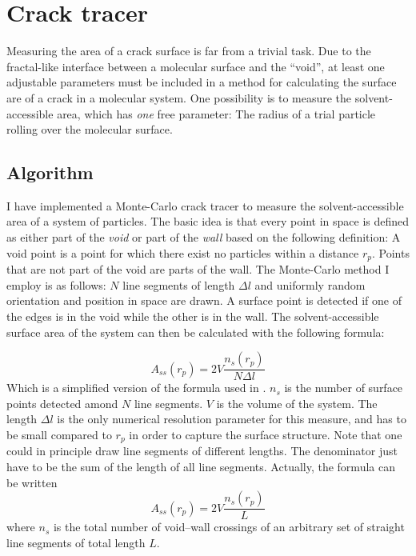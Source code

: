 \section{Crack tracer}
Measuring the area of a crack surface is far from a trivial task. Due to the fractal-like interface between a molecular surface and the ``void'', at least one adjustable parameters must be included in a method for calculating the surface are of a crack in a molecular system. One possibility is to measure the solvent-accessible area, which has \emph{one} free parameter: The radius of a trial particle rolling over the molecular surface. 


\subsection{Algorithm}
I have implemented a Monte-Carlo crack tracer to measure the solvent-accessible area of a system of particles. The basic idea is that every point in space is defined as either part of the \emph{void} or part of the \emph{wall} based on the following definition: A void point is a point for which there exist no particles within a distance $r_p$. Points that are not part of the void are parts of the wall. The Monte-Carlo method I employ is as follows: $N$ line segments of length $\Delta l$ and uniformly random orientation and position in space are drawn. A surface point is detected if one of the edges is in the void while the other is in the wall. The solvent-accessible surface area of the system can then be calculated with the following formula:

\begin{equation}
A_{ss}(r_p) = 2V\frac{n_s(r_p)}{N\Delta l}
\end{equation}
Which is a simplified version of the formula used in \citet{Bhattacharya2009}. $n_s$ is the number of surface points detected amond $N$ line segments. $V$ is the volume of the system. The length $\Delta l$ is the only numerical resolution parameter for this measure, and has to be small compared to $r_p$ in order to capture the surface structure. Note that one could in principle draw line segments of different lengths. The denominator just have to be the sum of the length of all line segments. Actually, the formula can be written
\begin{equation}
	A_{ss}(r_p) = 2V\frac{n_s(r_p)}{L}
\end{equation}
where $n_s$ is the total number of void--wall crossings of an arbitrary set of straight line segments of total length $L$.

